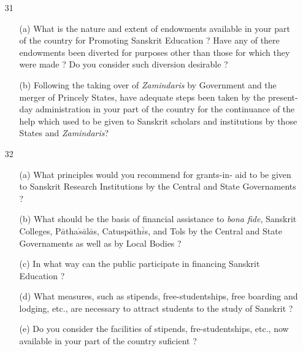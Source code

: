 \begin{itemize}
\begin{itemize}
            \end{itemize}                                           
\end{itemize}

{\rm 
\begin{itemize}
\item[31] \begin{itemize}
           
           \item[(a)] What is the nature and extent of endowments available in your part of the country for Promoting Sanskrit Education ? Have any of there endowments been diverted for purposes other than those for which they were made ? Do you consider such diversion desirable ? 
           
           \item[(b)] Following the taking over of {\textit {Zamindaris}} by Government and the merger of Princely States, have adequate steps been taken by the present-day administration in your part of the country for the continuance of the help which used to be given to Sanskrit scholars and institutions by those States and {\textit {Zamindaris}}?
           
          \end{itemize}
          
 \item[32] \begin{itemize}
            
            \item[(a)] What principles would you recommend for grants-in- aid to be given to Sanskrit Research Institutions by the Central and State Governaments ?
            
            \item[(b)] What should be the basis of financial assistance to {\textit {bona fide}}, Sanskrit Colleges, P$\bar{a}$tha$\acute{s}\bar{a}$l$\bar{a}$s, Catusp$\bar{a}$th$\bar{i}$s, and Tols by the Central and State Governaments as well as by Local Bodies ?
            
            \item[(c)] In what way can the public participate in financing Sanskrit Education ?
            
            \item[(d)] What measures, such as stipends, free-student\-ships, free boarding and lodging, etc., are necessary to attract students to the study of Sanskrit ? 
            
            \item[(e)] Do you consider the facilities of stipends, fre-studentships, etc., now available in your part of the country suficient ?
            

\end{itemize}
\end{itemize}}
